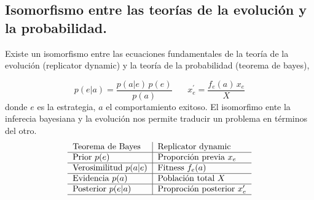 \documentclass[a4paper,10pt]{article}
\begin{document}
\subsection{Isomorfismo entre las teorías de la evolución y la probabilidad.}

Existe un isomorfismo entre las ecuaciones fundamentales de la teoría de la evolución (replicator dynamic) y la teoría de la probabilidad (teorema de bayes),

\begin{equation} 
 p(e|a) = \frac{p(a|e)\,p(e)}{p(a)}   \ \ \ \ \ \ \ \   x_e^\prime = \frac{f_e(a)\,x_e}{X}  
\end{equation}
%
donde $e$ es la estrategia, $a$ el comportamiento exitoso. 
El isomorfimo ente la inferecia bayesiana y la evolución nos permite traducir un problema en términos del otro.
%
\begin{align*}
\centering
 \begin{tabular}{l|l}
  Teorema de Bayes & Replicator dynamic  \\ \hline
  Prior $p(e)$ & Proporción previa $x_e$ \\ \hline
  Verosimilitud $p(a|e)$ & Fitness $f_e(a)$ \\ \hline
  Evidencia $p(a)$ & Población total $X$ \\ \hline
  Posterior $p(e|a)$ & Proproción posterior $x_e^\prime$ \\ \hline
 \end{tabular}
\end{align*}
\end{document}
